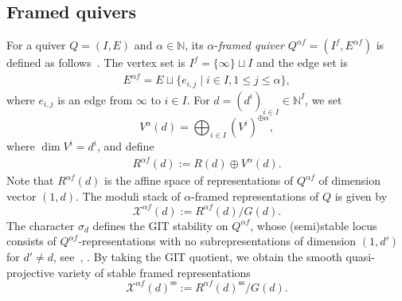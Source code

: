 \documentclass [11pt,oneside,a4paper,mathscr]{amsart}
\theoremstyle{definition}
\renewcommand{\leq}{\leqslant}
\newcommand{\X}{\mathscr{X}}
\begin{document}
\subsection{Framed quivers}\label{subsec:framedquiver}
For a quiver $Q=(I,E)$
and $\alpha \in \mathbb{N}$, 
its $\alpha$-\textit{framed quiver} 
$Q^{\alpha f}=(I^f, E^{\alpha f})$ is defined as follows~\cite{EnRei}. 
The vertex set is $I^f=\{\infty\} \sqcup I$
and the edge set is 
\begin{align*}E^{\alpha f}=E\sqcup \{e_{i, j}\mid i\in I, 1\leq j \leq \alpha\},
\end{align*}
where $e_{i, j}$ is an edge from $\infty$ to $i\in I$. 
For $d=(d^i)_{i\in I}\in\mathbb{N}^I$, 
we set \[V^{\alpha}(d)=\bigoplus_{i\in I}(V^i)^{\oplus \alpha},\] where $\dim V^i=d^i$, 
and define 
 \begin{align}\label{Rf:framed}R^{\alpha f}(d):=R(d)\oplus V^{\alpha}(d).
 \end{align}
 Note that $R^{\alpha f}(d)$ is 
 the affine space of representations of $Q^{\alpha f}$ of dimension 
 vector $(1, d)$. 
 The moduli stack of $\alpha$-framed representations of $Q$ is given by 
\[\X^{\alpha f}(d):=R^{\alpha f}(d)/G(d).\]
The character $\sigma_{d}$ defines 
the GIT stability on $Q^{\alpha f}$, 
whose (semi)stable locus 
consists of 
$Q^{\alpha f}$-representations with 
no subrepresentations of dimension $(1,d')$ for $d' \neq d$,  
see~\cite{EnRei}, \cite[Lemma~5.1.9]{T}. 
By taking the GIT quotient, 
we obtain the smooth quasi-projective variety of 
stable framed representations 
\[\X^{\alpha f}(d)^{\text{ss}}:=R^{\alpha f}(d)^{\text{ss}}/G(d).\]
\end{document}
